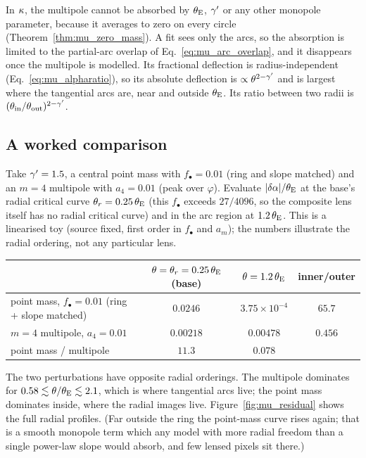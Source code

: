 In $\kappa$, the multipole cannot be absorbed by $\theta_{\mathrm{E}}$, $\gamma'$ or
any other monopole parameter, because it averages to zero on every
circle (Theorem~\ref{thm:mu_zero_mass}).  A fit sees only the arcs, so
the absorption is limited to the partial-arc overlap of
Eq.~\eqref{eq:mu_arc_overlap}, and it disappears once the multipole is
modelled.  Its fractional deflection is
radius-independent (Eq.~\eqref{eq:mu_alpharatio}), so its absolute
deflection is $\propto\theta^{2-\gamma'}$ and is largest where the
tangential arcs are, near and outside $\theta_{\mathrm{E}}$.  Its ratio between two
radii is $(\theta_{\rm in}/\theta_{\rm out})^{2-\gamma'}$.

\subsection{A worked comparison}

Take $\gamma'=1.5$, a central point mass with $f_\bullet=0.01$ (ring and
slope matched) and an $m=4$ multipole with $a_4=0.01$ (peak over
$\varphi$).  Evaluate $|\delta\alpha|/\theta_{\mathrm{E}}$ at the base's radial
critical curve $\theta_r = 0.25\,\theta_{\mathrm{E}}$ (this $f_\bullet$ exceeds
$27/4096$, so the composite lens itself has no radial critical curve)
and in the arc region at $1.2\,\theta_{\mathrm{E}}$.  This is a linearised toy
(source fixed, first order in $f_\bullet$ and $a_m$); the numbers
illustrate the radial ordering, not any particular lens.
\begin{center}
\begin{tabular}{@{}lccc@{}}
\toprule
 & $\theta=\theta_r=0.25\,\theta_{\mathrm{E}}$ (base) & $\theta=1.2\,\theta_{\mathrm{E}}$ & inner/outer \\
\midrule
point mass, $f_\bullet = 0.01$ (ring + slope matched) & $0.0246$ & $3.75\times10^{-4}$ & $65.7$ \\
$m=4$ multipole, $a_4=0.01$ & $0.00218$ & $0.00478$ & $0.456$ \\
\midrule
point mass / multipole & $11.3$ & $0.078$ & \\
\bottomrule
\end{tabular}
\end{center}
The two perturbations have opposite radial orderings.  The
multipole dominates for $0.58\lesssim\theta/\theta_{\mathrm{E}}\lesssim2.1$, which
is where tangential arcs live; the point mass dominates inside, where
the radial images live.  Figure~\ref{fig:mu_residual} shows the full
radial profiles.  (Far outside the ring the point-mass curve rises
again; that is a smooth monopole term which any model with more radial
freedom than a single power-law slope would absorb, and few lensed
pixels sit there.)

